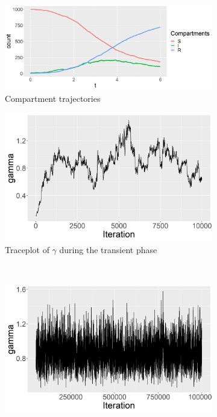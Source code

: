 \documentclass[11pt]{article}
\begin{document}
	\begin{figure}
		\centering
		\begin{subfigure}[b]{0.42\textwidth}
			\centering
			\includegraphics[width=\textwidth]{E1_trajectories}
			\caption{Compartment trajectories}
			\label{fig:E1_trajectories}
		\end{subfigure}
		\hfill
		\begin{subfigure}[b]{0.41\textwidth}
			\centering
			\includegraphics[width=\textwidth]{E1_short_no_burn_gamma_tp}
			\caption{Traceplot of $\gamma$ during the transient phase}
			\label{fig:E1_short_no_burn_gamma_tp}
		\end{subfigure}
		\\
		\begin{subfigure}[b]{0.41\textwidth}
			\centering
			\includegraphics[width=\textwidth]{E1_burn_gamma_tp}

\end{subfigure}
\end{figure}
\end{document}
